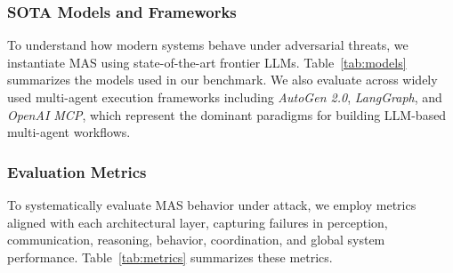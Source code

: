 \subsubsection{SOTA Models and Frameworks}

To understand how modern systems behave under adversarial threats, we instantiate MAS using state-of-the-art frontier LLMs. Table~\ref{tab:models} summarizes the models used in our benchmark. We also evaluate across widely used multi-agent execution frameworks including \textit{AutoGen 2.0}, \textit{LangGraph}, and \textit{OpenAI MCP}, which represent the dominant paradigms for building LLM-based multi-agent workflows.
\begin{table}[htbp]
\centering
\caption{State-of-the-art LLM models included in our benchmark evaluation.}
\label{tab:models}
\end{table}

\subsubsection{Evaluation Metrics}

To systematically evaluate MAS behavior under attack, we employ metrics aligned with each architectural layer, capturing failures in perception, communication, reasoning, behavior, coordination, and global system performance. Table~\ref{tab:metrics} summarizes these metrics.

